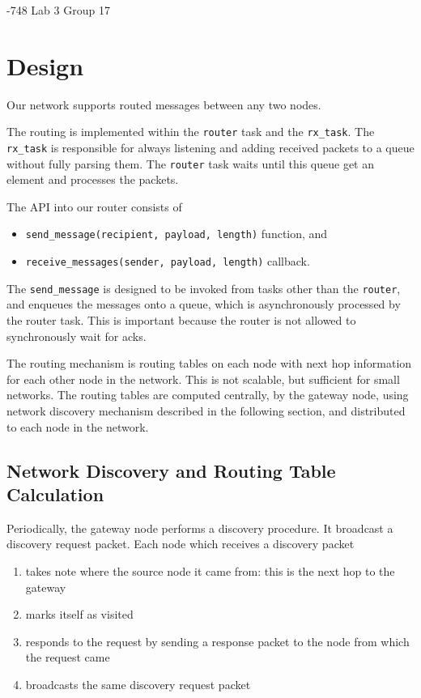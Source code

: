 \documentclass{article}
\begin{document}
-748 Lab 3 \hfill Group 17

\noindent \hrulefill

\section{Design}

Our network supports routed messages between any two nodes.

The routing is implemented within the \texttt{router} task and the
\texttt{rx\_task}. The \texttt{rx\_task} is responsible for always listening
and adding received packets to a queue without fully parsing them. The
\texttt{router} task waits until this queue get an element and processes the
packets.

The API into our router consists of
\begin{itemize}
\item \texttt{send\_message(recipient, payload, length)} function, and
\item \texttt{receive\_messages(sender, payload, length)} callback.
\end{itemize}

The \texttt{send\_message} is designed to be invoked from tasks other than the
\texttt{router}, and enqueues the messages onto a queue, which is
asynchronously processed by the router task. This is important because the
router is not allowed to synchronously wait for acks.

The routing mechanism is routing tables on each node with next hop information
for each other node in the network. This is not scalable, but sufficient for
small networks. The routing tables are computed centrally, by the gateway node,
using network discovery mechanism described in the following section, and
distributed to each node in the network.

\subsection{Network Discovery and Routing Table Calculation}

Periodically, the gateway node performs a discovery procedure. It
broadcast a discovery request packet. Each node which receives
a discovery packet
\begin{enumerate}
\item takes note where the source node it came from: this is
the next hop to the gateway
\item marks itself as visited
\item responds to the request by sending a response packet
to the node from which the request came
\item broadcasts the same discovery request packet
\end{enumerate}
\end{document}
